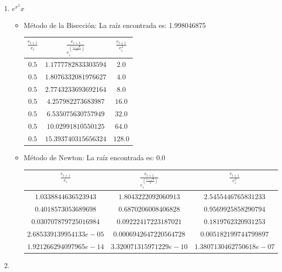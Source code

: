 \documentclass{article}
\begin{document}
\begin{enumerate}[I)]
\begin{enumerate}[(1)]
\vspace{5mm}
\item $e^{x^2}x$
\begin{itemize}
\item Método de la Bisección: La raíz encontrada es: 1.998046875 \\
\newline
\begin{tabular}{|c|c|c|}
\hline
$\frac{e_{i+1}}{e_i}$ & $\frac{e_{i+1}}{e^{\left(\frac{1 + \sqrt{5}}{2}\right)}_i}$ & $\frac{e_{i+1}}{e^2_i}$ \\
\hline
$0.5$ & $1.1777782833303594$ & $2.0$\\
\hline 
$0.5$ & $1.8076332081976627$ & $4.0$ \\
\hline 
$0.5$ & $2.7743233693692164$ & $8.0$ \\
\hline 
$0.5$ & $4.257982273683987$ & $16.0$ \\
\hline 
$0.5$ & $6.535075630757949$ & $32.0$ \\
\hline 
$0.5$ & $10.02991810550125$ & $64.0$ \\
\hline 
$0.5$ & $15.393740315656324$ & $128.0$ \\
\hline 
\end{tabular}
\newline
\item Método de Newton: La raíz encontrada es: 0.0 \\
\newline
\begin{tabular}{|c|c|c|}
\hline
$\frac{e_{i+1}}{e_i}$ & $\frac{e_{i+1}}{e^{\left(\frac{1 + \sqrt{5}}{2}\right)}_i}$ & $\frac{e_{i+1}}{e^2_i}$ \\
\hline
$1.0338844636523943$ & $1.8043222092060913$ & $2.5455446765831233$\\
\hline 
$0.4018573053689698$ & $0.6870206008406828$ & $0.9569925858290794$ \\
\hline 
$0.030707879725016984$ & $0.09222417223187021$ & $0.1819762320931253$ \\
\hline 
$2.685339139954133e-05$ & $0.0006942647220564728$ & $0.005182199744799897$ \\
\hline
$1.921266294097965e-14$ & $3.320071315971229e-10$ & $1.3807130462750618e-07$ \\
\hline
\end{tabular}
\end{itemize}

\item
\end{enumerate}


\end{enumerate}
\end{document}
